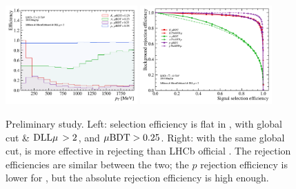 \begin{figure}[!htb]
    \centering
    \includegraphics[width=0.45\textwidth]{./figs-selection-tech/eff_Brunel_PT_up_pidcalib_ubdt_eff.pdf}
    \hspace{1em}
    \includegraphics[width=0.45\textwidth]{./figs-selection-tech/rej_v_eff_unbiased_Brunel_PT.pdf}

    \caption{
        Preliminary \UBDT study.
        Left: \UBDT \muon selection efficiency is flat in \pt, with
        global cut \isMuon \& $\text{\PID{\muon}}\! > 2$,
        and $\mu\text{BDT} > 0.25$.
        Right: with the same global cut, \UBDT is more effective in rejecting
        \pion than LHCb official \ProbNN{\muon}.
        The \kaon rejection efficiencies are similar between the two;
        the $p$ rejection efficiency is lower for \UBDT, but the absolute
        rejection efficiency is high enough.
    }
    \label{fig:ubdt-eff}
\end{figure}
